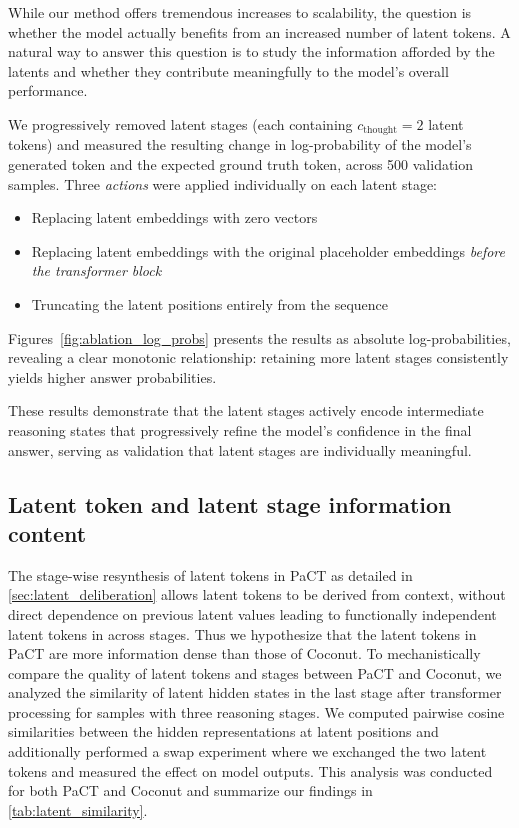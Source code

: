 While our method offers tremendous increases to scalability, the question is whether the model actually benefits from an increased number of latent tokens. A natural way to answer this question is to study the information afforded by the latents and whether they contribute meaningfully to the model's overall performance.

\noindent
We progressively removed latent stages (each containing $c_{\text{thought}}=2$ latent tokens) and measured the resulting change in log-probability of the model's generated token and the expected ground truth token, across 500 validation samples. Three \textit{actions} were applied individually on each latent stage:
\begin{itemize}
    \item Replacing latent embeddings with zero vectors
    \item Replacing latent embeddings with the original placeholder embeddings \textit{before the transformer block}
    \item Truncating the latent positions entirely from the sequence
\end{itemize}

Figures~\ref{fig:ablation_log_probs} presents the results as absolute log-probabilities, revealing a clear monotonic relationship: retaining more latent stages consistently yields higher answer probabilities. 

These results demonstrate that the latent stages actively encode intermediate reasoning states that progressively refine the model's confidence in the final answer, serving as validation that latent stages are individually meaningful.

\subsection{Latent token and latent stage information content}

The stage-wise resynthesis of latent tokens in PaCT as detailed in \ref{sec:latent_deliberation} allows latent tokens to be derived from context, without direct dependence on previous latent values leading to functionally independent latent tokens in across stages. Thus we hypothesize that the latent tokens in PaCT are more information dense than those of Coconut. To mechanistically compare the quality of latent tokens and stages between PaCT and Coconut, we analyzed the similarity of latent hidden states in the last stage after transformer processing for samples with three reasoning stages. We computed pairwise cosine similarities between the hidden representations at latent positions and additionally performed a swap experiment where we exchanged the two latent tokens and measured the effect on model outputs. This analysis was conducted for both PaCT and Coconut and summarize our findings in \ref{tab:latent_similarity}.

